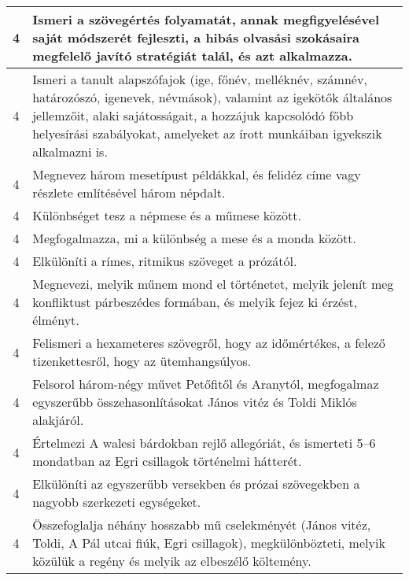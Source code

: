 \begin{longtable}{c | p{} }
                                
                                          4 &  Ismeri a szövegértés folyamatát, annak megfigyelésével saját módszerét fejleszti, a hibás olvasási szokásaira megfelelő javító stratégiát talál, és azt alkalmazza. \\ \hline
                                          4 &  Ismeri a tanult alapszófajok (ige, főnév, melléknév, számnév, határozószó, igenevek, névmások), valamint az igekötők általános jellemzőit, alaki sajátosságait, a hozzájuk kapcsolódó főbb helyesírási szabályokat, amelyeket az írott munkáiban igyekszik alkalmazni is. \\ \hline
                                          4 &  Megnevez három mesetípust példákkal, és felidéz címe vagy részlete említésével három népdalt. \\ \hline
                                          4 &  Különbséget tesz a népmese és a műmese között. \\ \hline
                                          4 &  Megfogalmazza, mi a különbség a mese és a monda között. \\ \hline
                                          4 &  Elkülöníti a rímes, ritmikus szöveget a prózától. \\ \hline
                                          4 &  Megnevezi, melyik műnem mond el történetet, melyik jelenít meg konfliktust párbeszédes formában, és melyik fejez ki érzést, élményt. \\ \hline
                                          4 &  Felismeri a hexameteres szövegről, hogy az időmértékes, a felező tizenkettesről, hogy az ütemhangsúlyos. \\ \hline
                                          4 &  Felsorol három-négy művet Petőfitől és Aranytól, megfogalmaz egyszerűbb  összehasonlításokat János vitéz és Toldi Miklós alakjáról. \\ \hline
                                          4 &  Értelmezi A walesi bárdokban rejlő allegóriát, és ismerteti 5–6 mondatban az Egri csillagok történelmi hátterét. \\ \hline
                                          4 &  Elkülöníti az egyszerűbb versekben és prózai szövegekben a nagyobb szerkezeti egységeket. \\ \hline
                                          4 &  Összefoglalja néhány hosszabb mű cselekményét (János vitéz, Toldi, A Pál utcai fiúk, Egri csillagok), megkülönbözteti, melyik közülük a regény és melyik az elbeszélő költemény. \\ \hline

\end{longtable}
